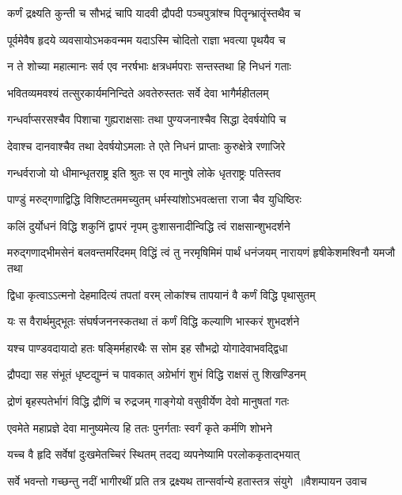 \twolineshloka
{कर्णं द्रक्ष्यति कुन्ती च सौभद्रं चापि यादवी}
{द्रौपदी पञ्चपुत्रांश्च पितॄन्भ्रातॄंस्तथैव च}


\twolineshloka
{पूर्वमेवैष हृदये व्यवसायोऽभकवन्मम}
{यदाऽस्मि चोदितो राज्ञा भवत्या पृथयैव च}


\twolineshloka
{न ते शोच्या महात्मानः सर्व एव नरर्षभाः}
{क्षत्रधर्मपराः सन्तस्तथा हि निधनं गताः}


\twolineshloka
{भवितव्यमवश्यं तत्सुरकार्यमनिन्दिते}
{अवतेरुस्ततः सर्वे देवा भागैर्महीतलम्}


\twolineshloka
{गन्धर्वाप्सरसश्चैव पिशाचा गुह्यराक्षसाः}
{तथा पुण्यजनाश्चैव सिद्धा देवर्षयोपि च}


\twolineshloka
{देवाश्च दानवाश्चैव तथा देवर्षयोऽमलाः}
{ते एते निधनं प्राप्ताः कुरुक्षेत्रे रणाजिरे}


\twolineshloka
{गन्धर्वराजो यो धीमान्धृतराष्ट्र इति श्रुतः}
{स एव मानुषे लोके धृतराष्ट्रः पतिस्तव}


\twolineshloka
{पाण्डुं मरुद्गणाद्विद्धि विशिष्टतममच्युतम्}
{धर्मस्यांशोऽभवत्क्षत्ता राजा चैव युधिष्ठिरः}


\twolineshloka
{कलिं दुर्योधनं विद्धि शकुनिं द्वापरं नृपम्}
{दुःशासनादीन्विद्धि त्वं राक्षसान्शुभदर्शने}


\threelineshloka
{मरुद्गणाद्भीमसेनं बलवन्तमरिंदमम्}
{विद्धिं त्वं तु नरमृषिमिमं पार्थं धनंजयम्}
{नारायणं हृषीकेशमश्विनौ यमजौ तथा}


\twolineshloka
{द्विधा कृत्वाऽऽत्मनो देहमादित्यं तपतां वरम्}
{लोकांश्च तापयानं वै कर्णं विद्धि पृथासुतम्}


\twolineshloka
{यः स वैरार्थमुद्भूतः संघर्षजननस्कतथा}
{तं कर्णं विद्धि कल्याणि भास्करं शुभदर्शने}


\twolineshloka
{यश्च पाण्डवदायादो हतः षङ्मिर्महारथैः}
{स सोम इह सौभद्रो योगादेवाभवद्द्विधा}


\twolineshloka
{द्रौपद्या सह संभूतं धृष्टद्युम्नं च पावकात्}
{अग्रेर्भागं शुभं विद्धि राक्षसं तु शिखण्डिनम्}


\twolineshloka
{द्रोणं बृहस्पतेर्भागं विद्धि द्रौणिं च रुद्रजम्}
{गाङ्गेयो वसुवीर्येण देवो मानुषतां गतः}


\twolineshloka
{एवमेते महाप्रज्ञे देवा मानुष्यमेत्य हि}
{ततः पुनर्गताः स्वर्गं कृते कर्मणि शोभने}


\twolineshloka
{यच्च वै हृदि सर्वेषां दुःखमेतच्चिरं स्थितम्}
{तदद्य व्यपनेष्यामि परलोककृताद्भयात्}


\threelineshloka
{सर्वे भवन्तो गच्छन्तु नदीं भागीरथीं प्रति}
{तत्र द्रक्ष्यथ तान्सर्वान्ये हतास्तत्र संयुगे ॥वैशम्पायन उवाच}
{}


